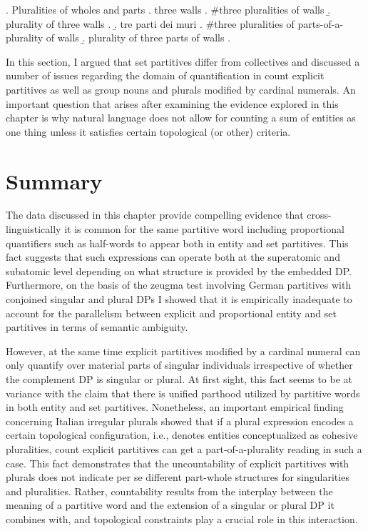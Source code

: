 		\ex. Pluralities of wholes and parts\label{ex:count-explicit-partitives-numeral-phrases}
        \a. three walls
		\a. \#three pluralities of walls
		\b. plurality of three walls
        \z.
        \b. tre parti dei muri
		\a. \#three pluralities of parts-of-a-plurality of walls
		\b. plurality of three parts of walls
		\z.
		
In this section, I argued that set partitives differ from collectives and discussed a number of issues regarding the domain of quantification in count explicit partitives as well as group nouns and plurals modified by cardinal numerals. An important question that arises after examining the evidence explored in this chapter is why natural language does not allow for counting a sum of entities as one thing unless it satisfies certain topological (or other) criteria. 

\section{Summary}\label{sec:summary-ch2}

The data discussed in this chapter provide compelling evidence that cross-linguis\-tically it is common for the same partitive word including proportional quantifiers such as half-words to appear both in entity and set partitives. This fact suggests that such expressions can operate both at the superatomic and subatomic level depending on what structure is provided by the embedded DP. Furthermore, on the basis of the zeugma test involving German partitives with conjoined singular and plural DPs I showed that it is empirically inadequate to account for the parallelism between explicit and proportional entity and set partitives in terms of semantic ambiguity. 

However, at the same time explicit partitives modified by a cardinal numeral can only quantify over material parts of singular individuals irrespective of \linebreak whether the complement DP is singular or plural. At first sight, this fact seems to be at variance with the claim that there is unified parthood utilized by partitive words in both entity and set partitives. Nonetheless, an important empirical finding concerning Italian irregular plurals showed that if a plural expression encodes a certain topological configuration, i.e., denotes entities conceptualized as cohesive pluralities, count explicit partitives can get a part-of-a-plurality reading in such a case. This fact demonstrates that the uncountability of explicit partitives with plurals does not indicate per se different part-whole structures for singularities and pluralities. Rather, countability results from the interplay between the meaning of a partitive word and the extension of a singular or plural DP it combines with, and topological constraints play a crucial role in this interaction.

